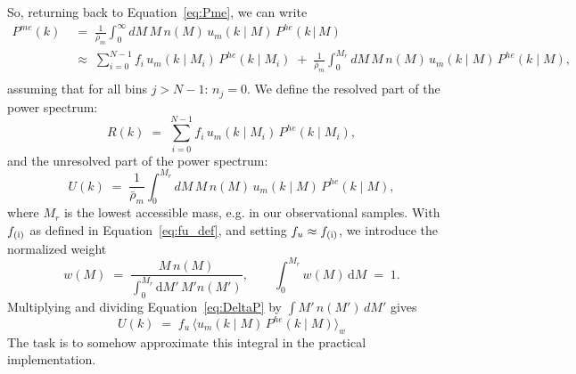 \documentclass{article}
\newcommand{\dd}{\mathrm{d}}
\begin{document}
So, returning back to Equation~\ref{eq:Pme}, we can write
\begin{equation}
\begin{aligned}
    P^{me} (k) &\;=\; \frac{1}{\bar \rho_m} \int_0 ^\infty dM\, M \,n(M) \, u_m(k \mid M) \, P^{he}(k \, | \, M) \\[2ex]
    &\;\approx\; \sum_{i=0}^{N-1} f_i \, u_m (k \mid M_i)\, P^{he}(k \mid M_i) \;+\; \frac{1}{\bar \rho_m} \int_0 ^{M_r} dM\, M \,n(M) \, u_m(k \mid M) \, P^{he}(k \mid M),\\
\end{aligned}
\label{eq:Pme_expansion}
\end{equation}
assuming that for all bins $j > N-1$: $n_j=0$. We define 
the resolved part of the power spectrum:
\begin{equation} \label{eq:Resolved}
    R (k) \;=\; \sum_{i=0}^{N-1}f_i \, u_m (k \mid M_i)\, P^{he}(k \mid M_i),
\end{equation}
and the unresolved part of the power spectrum:
\begin{equation} \label{eq:DeltaP}
    U(k) \;=\; \frac{1}{\bar \rho_m} \int_0 ^{M_r} dM\, M \,n(M) \, u_m(k \mid M) \, P^{he}(k \mid M),
\end{equation}
where $M_r$ is the lowest accessible mass, e.g. in our observational samples. With $f_{\rm (i)}$ as defined in Equation~\eqref{eq:fu_def}, and setting $f_u \approx f_{\rm (i)}$, we introduce the normalized weight
\[
w(M) \;=\; \frac{M\,n(M)}{\int _0 ^{M_r} \dd M' \, M'n(M')},
\qquad \int_0^{M_r} w(M) \, \dd M \;=\; 1 .
\] 
Multiplying and dividing Equation~\ref{eq:DeltaP} by $\int M'\, n(M')\,dM'$ gives
\begin{equation} \label{eq:DeltaP_braket}
    U(k) \;=\; f_u \,\langle u_m(k\mid M)\, P^{he}(k \mid M) \rangle_w
\end{equation}
The task is to somehow approximate this integral in the practical implementation.
\end{document}
